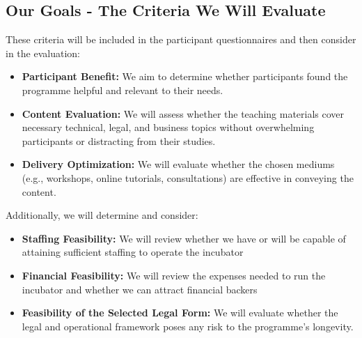 \subsection{Our Goals - The Criteria We Will Evaluate}
These criteria will be included in the participant questionnaires and then consider in the evaluation:
\begin{itemize}
    \item \textbf{Participant Benefit:}  We aim to determine whether participants found the programme helpful and relevant to their needs.
    \item \textbf{Content Evaluation:} We will assess whether the teaching materials cover necessary technical, legal, and business topics without overwhelming participants or distracting from their studies.
    \item \textbf{Delivery Optimization:} We will evaluate whether the chosen mediums (e.g., workshops, online tutorials, consultations) are effective in conveying the content.
\end{itemize}

Additionally, we will determine and consider:
\begin{itemize}
    \item \textbf{Staffing Feasibility:} We will review whether we have or will be capable of attaining sufficient staffing to operate the incubator
    \item \textbf{Financial Feasibility:} We will review the expenses needed to run the incubator and whether we can attract financial backers
    \item \textbf{Feasibility of the Selected Legal Form:} We will evaluate whether the legal and operational framework poses any risk to the programme’s longevity.
\end{itemize}

